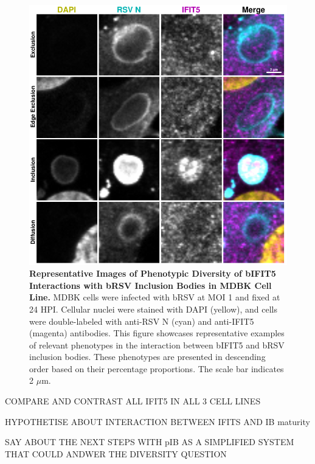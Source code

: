 \begin{figure}
    \centering
    \includegraphics[width=1\linewidth]{08. Chapter 3/Figs/02. Infection/04. IFIT5/09. mdbk i5.pdf}
    \caption[Representative Images of Phenotypic Diversity of bIFIT5 Interactions with bRSV Inclusion Bodies in MDBK Cell Line.]{\textbf{Representative Images of Phenotypic Diversity of bIFIT5 Interactions with bRSV Inclusion Bodies in MDBK Cell Line.} MDBK cells were infected with bRSV at MOI 1 and fixed at 24 HPI. Cellular nuclei were stained with DAPI (yellow), and cells were double-labeled with anti-RSV N (cyan) and anti-IFIT5 (magenta) antibodies. This figure showcases representative examples of relevant phenotypes in the interaction between bIFIT5 and bRSV inclusion bodies. These phenotypes are presented in descending order based on their percentage proportions. The scale bar indicates 2 \(\mu \mbox{m}\).}
    \label{fig:Representative Images of Phenotypic Diversity of bIFIT5 Interactions with bRSV Inclusion Bodies in MDBK Cell Line}
\end{figure}

COMPARE AND CONTRAST ALL IFIT5 IN ALL 3 CELL LINES

HYPOTHETISE ABOUT INTERACTION BETWEEN IFITS AND IB maturity

SAY ABOUT THE NEXT STEPS WITH pIB AS A SIMPLIFIED SYSTEM THAT COULD ANDWER THE DIVERSITY QUESTION

